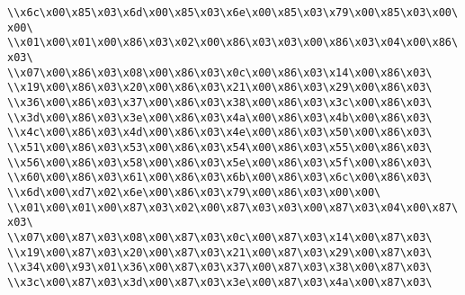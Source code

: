 \verb|\\x6c\x00\x85\x03\x6d\x00\x85\x03\x6e\x00\x85\x03\x79\x00\x85\x03\x00\x00\|\newline
\verb|\\x01\x00\x01\x00\x86\x03\x02\x00\x86\x03\x03\x00\x86\x03\x04\x00\x86\x03\|\newline
\verb|\\x07\x00\x86\x03\x08\x00\x86\x03\x0c\x00\x86\x03\x14\x00\x86\x03\|\newline
\verb|\\x19\x00\x86\x03\x20\x00\x86\x03\x21\x00\x86\x03\x29\x00\x86\x03\|\newline
\verb|\\x36\x00\x86\x03\x37\x00\x86\x03\x38\x00\x86\x03\x3c\x00\x86\x03\|\newline
\verb|\\x3d\x00\x86\x03\x3e\x00\x86\x03\x4a\x00\x86\x03\x4b\x00\x86\x03\|\newline
\verb|\\x4c\x00\x86\x03\x4d\x00\x86\x03\x4e\x00\x86\x03\x50\x00\x86\x03\|\newline
\verb|\\x51\x00\x86\x03\x53\x00\x86\x03\x54\x00\x86\x03\x55\x00\x86\x03\|\newline
\verb|\\x56\x00\x86\x03\x58\x00\x86\x03\x5e\x00\x86\x03\x5f\x00\x86\x03\|\newline
\verb|\\x60\x00\x86\x03\x61\x00\x86\x03\x6b\x00\x86\x03\x6c\x00\x86\x03\|\newline
\verb|\\x6d\x00\xd7\x02\x6e\x00\x86\x03\x79\x00\x86\x03\x00\x00\|\newline
\verb|\\x01\x00\x01\x00\x87\x03\x02\x00\x87\x03\x03\x00\x87\x03\x04\x00\x87\x03\|\newline
\verb|\\x07\x00\x87\x03\x08\x00\x87\x03\x0c\x00\x87\x03\x14\x00\x87\x03\|\newline
\verb|\\x19\x00\x87\x03\x20\x00\x87\x03\x21\x00\x87\x03\x29\x00\x87\x03\|\newline
\verb|\\x34\x00\x93\x01\x36\x00\x87\x03\x37\x00\x87\x03\x38\x00\x87\x03\|\newline
\verb|\\x3c\x00\x87\x03\x3d\x00\x87\x03\x3e\x00\x87\x03\x4a\x00\x87\x03\|\newline
